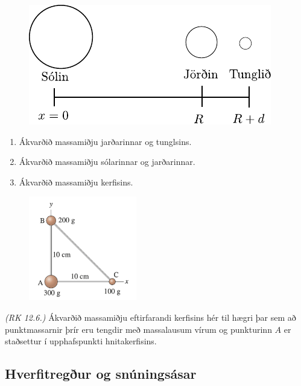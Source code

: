 \begin{enumerate}[label = \textbf{Dæmi \thechapter.\arabic*.}]
\begin{figure}[H]
    \centering
    \includegraphics{figures/soljordtungl.pdf}
\end{figure}

\begin{enumerate}[label = \textbf{(\alph*)}]
    \item Ákvarðið massamiðju jarðarinnar og tunglsins.
    \item Ákvarðið massamiðju sólarinnar og jarðarinnar.
    \item Ákvarðið massamiðju kerfisins.
\end{enumerate}


\begin{minipage}{\linewidth}

\begin{figure}
\vspace{-3cm}
\includegraphics[width=1.85in]{images/cmbert.png}
\end{figure}

\item \textit{(RK 12.6.)} Ákvarðið massamiðju eftirfarandi kerfisins hér til hægri þar sem að punktmassarnir þrír eru tengdir með massalausum vírum og punkturinn $A$ er staðsettur í upphafspunkti hnitakerfisins.

\end{minipage}


\newpage

\subsection*{Hverfitregður og snúningsásar}


\end{enumerate}
